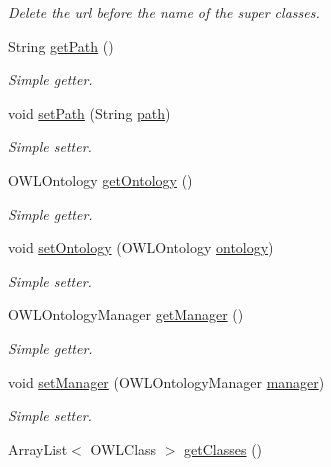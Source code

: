 \begin{DoxyCompactItemize}
\begin{DoxyCompactList}\small\item\em Delete the url before the name of the super classes. \end{DoxyCompactList}\item 
String \hyperlink{class_ontology_1_1_ontology_ae9cfbb719718be8b33769084b0ba7e0b}{getPath} ()
\begin{DoxyCompactList}\small\item\em Simple getter. \end{DoxyCompactList}\item 
void \hyperlink{class_ontology_1_1_ontology_abb3b2c84c1859839c6977b00dbd9e02a}{setPath} (String \hyperlink{class_ontology_1_1_ontology_a70b39a7517df023757f3dd3a652cf879}{path})
\begin{DoxyCompactList}\small\item\em Simple setter. \end{DoxyCompactList}\item 
OWLOntology \hyperlink{class_ontology_1_1_ontology_a99b88c305a00321e13f8e83009d15c5c}{getOntology} ()
\begin{DoxyCompactList}\small\item\em Simple getter. \end{DoxyCompactList}\item 
void \hyperlink{class_ontology_1_1_ontology_a348ff8de8e4faee52779aa5f808bd73f}{setOntology} (OWLOntology \hyperlink{class_ontology_1_1_ontology_a0fe57c961d9d32854e141a7908f513f0}{ontology})
\begin{DoxyCompactList}\small\item\em Simple setter. \end{DoxyCompactList}\item 
OWLOntologyManager \hyperlink{class_ontology_1_1_ontology_ad667d0984a9104d1d52b6cd60126632f}{getManager} ()
\begin{DoxyCompactList}\small\item\em Simple getter. \end{DoxyCompactList}\item 
void \hyperlink{class_ontology_1_1_ontology_a802994698b3a28c8ad6e31f2c02299cf}{setManager} (OWLOntologyManager \hyperlink{class_ontology_1_1_ontology_a23f7c60be021e9813bc3b004166b12d1}{manager})
\begin{DoxyCompactList}\small\item\em Simple setter. \end{DoxyCompactList}\item 
ArrayList$<$ OWLClass $>$ \hyperlink{class_ontology_1_1_ontology_a02dbe350e5c6c59c8a27dff7f3a643d7}{getClasses} ()

\end{DoxyCompactItemize}
